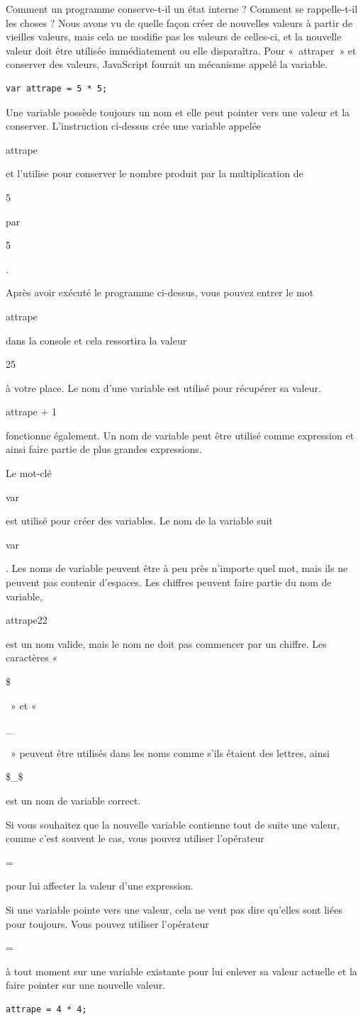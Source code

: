 \documentclass{FramateX}
\renewcommand{\texttt}[1]{\begin{sffamily}{#1}\end{sffamily}}
\begin{document}
\begin{center}\end{center}

Comment un programme conserve-t-il un état interne ? Comment se
rappelle-t-il les choses ? Nous avons vu de quelle façon créer de
nouvelles valeurs à partir de vieilles valeurs, mais cela ne modifie pas
les valeurs de celles-ci, et la nouvelle valeur doit être utilisée
immédiatement ou elle disparaîtra. Pour «~attraper~» et conserver des
valeurs, JavaScript fournit un mécanisme appelé la variable.

\begin{lstlisting}
var attrape = 5 * 5;
\end{lstlisting}
Une variable possède toujours un nom et elle peut pointer vers une
valeur et la conserver. L'instruction ci-dessus crée une variable
appelée \texttt{attrape} et l'utilise pour conserver le nombre produit
par la multiplication de \texttt{5} par \texttt{5}.

Après avoir exécuté le programme ci-dessus, vous pouvez entrer le mot
\texttt{attrape} dans la console et cela ressortira la valeur
\texttt{25} à votre place. Le nom d'une variable est utilisé pour
récupérer sa valeur. \texttt{attrape + 1} fonctionne également. Un nom
de variable peut être utilisé comme expression et ainsi faire partie de
plus grandes expressions.

Le mot-clé \texttt{var} est utilisé pour créer des variables. Le nom de
la variable suit \texttt{var}. Les noms de variable peuvent être à peu
près n'importe quel mot, mais ils ne peuvent pas contenir d'espaces. Les
chiffres peuvent faire partie du nom de variable, \texttt{attrape22} est
un nom valide, mais le nom ne doit pas commencer par un chiffre. Les
caractères «~\texttt{\$}~» et «~\texttt{\_}~» peuvent être utilisés dans
les noms comme s'ils étaient des lettres, ainsi \texttt{\$\_\$} est un
nom de variable correct.

Si vous souhaitez que la nouvelle variable contienne tout de suite une
valeur, comme c'est souvent le cas, vous pouvez utiliser l'opérateur
\texttt{=} pour lui affecter la valeur d'une expression.

Si une variable pointe vers une valeur, cela ne veut pas dire qu'elles
sont liées pour toujours. Vous pouvez utiliser l'opérateur \texttt{=} à
tout moment sur une variable existante pour lui enlever sa valeur
actuelle et la faire pointer sur une nouvelle valeur.

\begin{lstlisting}
attrape = 4 * 4;
\end{lstlisting}
\begin{center}\end{center}
\end{document}
